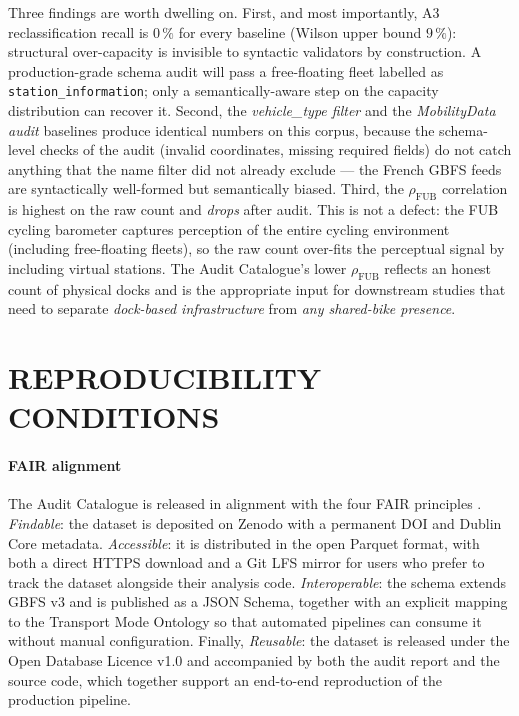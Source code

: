 \documentclass[a4paper,twoside]{article}
\begin{document}
Three findings are worth dwelling on. First, and most
importantly, A3 reclassification recall is $0\,\%$ for every
baseline (Wilson upper bound $9\,\%$): structural over-capacity
is invisible to syntactic validators by construction. A
production-grade schema audit will pass a free-floating fleet
labelled as \texttt{station\_information}; only a
semantically-aware step on the capacity distribution can
recover it. Second, the \emph{vehicle\_type filter} and the
\emph{MobilityData audit} baselines produce identical numbers
on this corpus, because the schema-level checks of the audit
(invalid coordinates, missing required fields) do not catch
anything that the name filter did not already exclude --- the
French GBFS feeds are syntactically well-formed but
semantically biased. Third, the $\rho_{\text{FUB}}$ correlation
is highest on the raw count and \emph{drops} after audit. This
is not a defect: the FUB cycling barometer captures perception
of the entire cycling environment (including free-floating
fleets), so the raw count over-fits the perceptual signal by
including virtual stations. The Audit Catalogue's lower
$\rho_{\text{FUB}}$ reflects an honest count of physical docks
and is the appropriate input for downstream studies that need
to separate \emph{dock-based infrastructure} from \emph{any
shared-bike presence}.

\section{\uppercase{Reproducibility Conditions}}
\label{secReproducibility}

\paragraph{FAIR alignment}
The Audit Catalogue is released in alignment with the four FAIR
principles \cite{Wilkinson2016}. \emph{Findable}: the dataset is
deposited on Zenodo with a permanent DOI and Dublin Core
metadata. \emph{Accessible}: it is distributed in the open
Parquet format, with both a direct HTTPS download and a Git LFS
mirror for users who prefer to track the dataset alongside their
analysis code. \emph{Interoperable}: the schema extends GBFS v3
and is published as a JSON Schema, together with an explicit
mapping to the Transport Mode Ontology so that automated
pipelines can consume it without manual configuration. Finally,
\emph{Reusable}: the dataset is released under the Open Database
Licence v1.0 and accompanied by both the audit report and the
source code, which together support an end-to-end reproduction
of the production pipeline.
\end{document}
